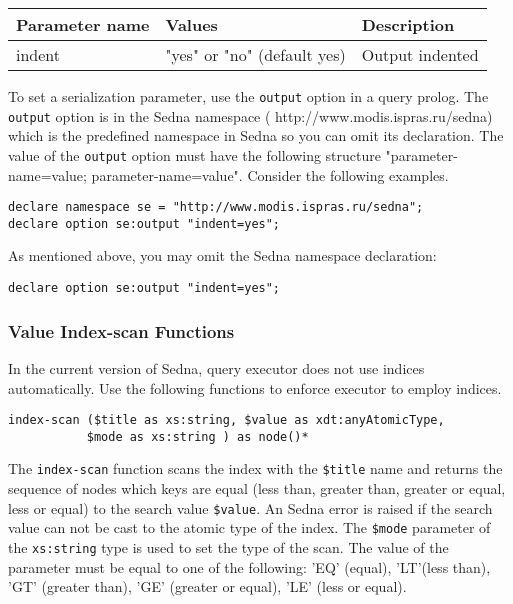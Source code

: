 \documentclass[a4paper,12pt]{article}
\begin{document}
\begin{tabular}{|l|l|l|}
\hline
Parameter name & Values & Description \\
\hline
\hline
indent & "yes" or "no" (default yes) & Output indented \\
\hline
\end{tabular}

To set a serialization parameter, use the \verb!output! option in a query prolog. The \verb!output! option is in the Sedna namespace (
http://www.modis.ispras.ru/sedna) which is the predefined namespace in Sedna so you can omit its declaration. The value of the \verb!output! option must have the following structure "parameter-name=value; parameter-name=value". Consider the following examples.

\begin{verbatim}
declare namespace se = "http://www.modis.ispras.ru/sedna";
declare option se:output "indent=yes";
\end{verbatim}

As mentioned above, you may omit the Sedna namespace declaration:
\begin{verbatim}
declare option se:output "indent=yes";
\end{verbatim}

\subsubsection{Value Index-scan Functions}
\label{sec:value-index-scan-fun}
In the current version of Sedna, query executor does not use indices
automatically. Use the following functions to enforce executor to employ
indices.

\begin{verbatim}
index-scan ($title as xs:string, $value as xdt:anyAtomicType,
           $mode as xs:string ) as node()*
\end{verbatim}

The \verb!index-scan! function scans the index with the \verb!$title!
name and returns the sequence of nodes which keys are equal (less than,
greater than, greater or equal, less or equal) to the search value
\verb!$value!. An Sedna error is raised if the search value can not be cast to
the atomic type of the index. The \verb!$mode! parameter of the
\verb!xs:string! type is used to set the type of the scan. The value of the
parameter must be equal to one of the following: 'EQ' (equal), 'LT'(less than),
'GT' (greater than), 'GE' (greater or equal), 'LE' (less or equal).
\end{document}
